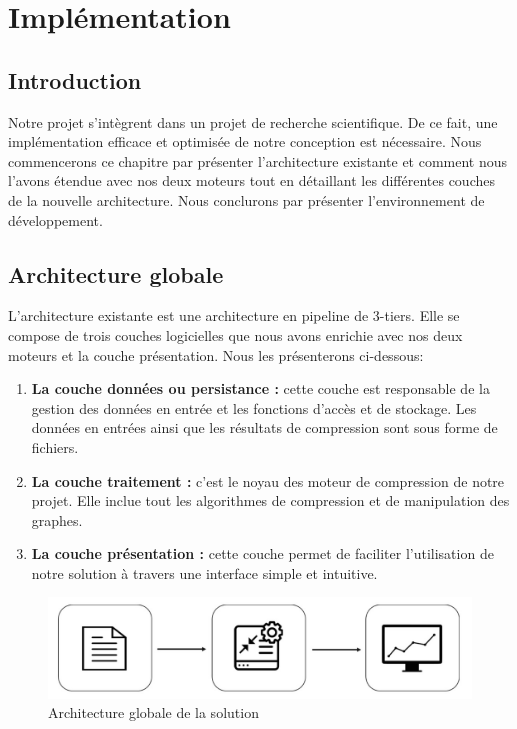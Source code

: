 \documentclass[a4paper,oneside,12pt]{report}
\theoremstyle{definition}
\begin{document}
	
	
	
	
\chapter{Implémentation}
	\section{Introduction}
	
	Notre projet s'intègrent dans un projet de recherche scientifique. De ce fait, une implémentation efficace et optimisée de notre conception est nécessaire. Nous commencerons ce chapitre par présenter l'architecture existante et comment nous l'avons étendue avec nos deux moteurs tout en détaillant les différentes couches de la nouvelle architecture. Nous conclurons par présenter l'environnement de développement.
	
	
	\section{Architecture globale}
	
	L'architecture existante est une architecture en pipeline de 3-tiers. Elle se compose de trois couches logicielles que nous avons enrichie avec nos deux moteurs et la couche présentation. Nous les présenterons ci-dessous:
	
	\begin{enumerate}
	\item \textbf{La couche données ou persistance :} cette couche est responsable de la gestion des données en entrée et les fonctions d'accès et de stockage. Les données en entrées ainsi que les résultats de compression sont sous forme de fichiers.
	
	\item \textbf{La couche traitement :} c'est le noyau des moteur de compression de notre projet. Elle inclue tout les algorithmes de compression et de manipulation des graphes. 
	\item \textbf{La couche présentation :} cette couche permet de faciliter l'utilisation de notre solution à travers une interface simple et intuitive.
	\end{enumerate}
	
	
	
\begin{figure}[H]
	\centering
	\label{Img:archglob}
	\includegraphics[scale=0.35]{ressources/image/ArchGlob.jpg}
	\caption{Architecture globale de la solution}

 \end{figure}
	
\end{document}
